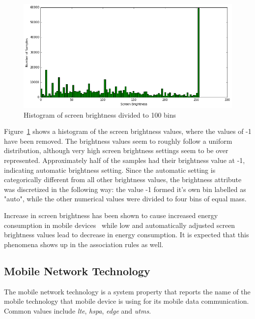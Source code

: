 \begin{figure} %
	\centering
	\includegraphics[width=\textwidth]{images/carat-data/screen_brightness.png}
	\caption{Histogram of screen brightness divided to 100 bins}
	\label{figure:carat-data-screen-brightness}
\end{figure}    

Figure~\ref{figure:carat-data-screen-brightness} shows a histogram of the screen brightness values, where the values of -1 have been removed. The brightness values seem to roughly follow a uniform distribution, although very high screen brightness settings seem to be over represented. Approximately half of the samples had their brightness value at -1, indicating automatic brightness setting. Since the automatic setting is categorically different from all other brightness values, the brightness attribute was discretized in the following way: the value -1 formed it's own bin labelled as "auto", while the other numerical values were divided to four bins of equal mass.   

Increase in screen brightness has been shown to cause increased energy consumption in mobile devices~\cite{5375354, PELTONEN201671} while low and automatically adjusted screen brightness values lead to decrease in energy consumption. It is expected that this phenomena shows up in the association rules as well.

\subsection{Mobile Network Technology}  

The mobile network technology is a system property that reports the name of the mobile technology that mobile device is using for its mobile data communication. Common values include \textit{lte}, \textit{hspa}, \textit{edge} and \textit{utms}.

